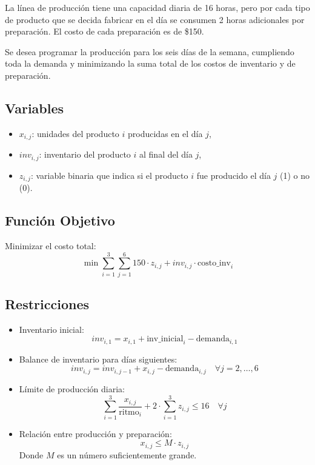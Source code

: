 \documentclass[12pt, a4paper, oneside]{book}
\theoremstyle{definition}
\begin{document}
    La línea de producción tiene una capacidad diaria de 16 horas, pero por cada tipo de producto que se decida fabricar en el día se consumen 2 horas adicionales por preparación. El costo de cada preparación es de \$150.

    Se desea programar la producción para los seis días de la semana, cumpliendo toda la demanda y minimizando la suma total de los costos de inventario y de preparación.

    \subsection{Variables}

    \begin{itemize}
        \item \(x_{i,j}\): unidades del producto \(i\) producidas en el día \(j\),
        \item \(inv_{i,j}\): inventario del producto \(i\) al final del día \(j\),
        \item \(z_{i,j}\): variable binaria que indica si el producto \(i\) fue producido el día \(j\) (1) o no (0).
    \end{itemize}

    \subsection{Función Objetivo}

    Minimizar el costo total:
    \[
    \min \sum_{i=1}^{3} \sum_{j=1}^{6} 150 \cdot z_{i,j} + inv_{i,j} \cdot \text{costo\_inv}_i
    \]

    \subsection{Restricciones}

    \begin{itemize}
        \item Inventario inicial:
        \[
        inv_{i,1} = x_{i,1} + \text{inv\_inicial}_i - \text{demanda}_{i,1}
        \]
        \item Balance de inventario para días siguientes:
        \[
        inv_{i,j} = inv_{i,j-1} + x_{i,j} - \text{demanda}_{i,j} \quad \forall j = 2, \dots, 6
        \]
        \item Límite de producción diaria:
        \[
        \sum_{i=1}^{3} \frac{x_{i,j}}{\text{ritmo}_i} + 2 \cdot \sum_{i=1}^{3} z_{i,j} \leq 16 \quad \forall j
        \]
        \item Relación entre producción y preparación:
        \[
        x_{i,j} \leq M \cdot z_{i,j}
        \]
        Donde \(M\) es un número suficientemente grande.
    \end{itemize}
\end{document}
